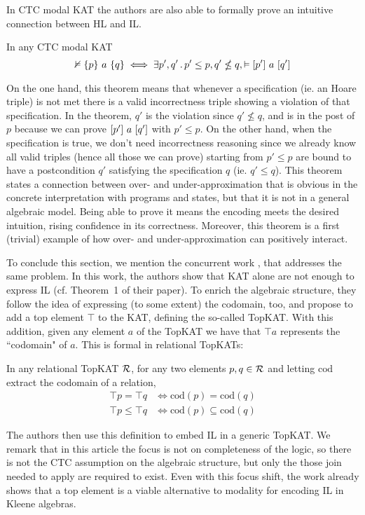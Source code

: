 In CTC modal KAT the authors are also able to formally prove an intuitive connection between HL and IL.
\begin{theorem}\label{th:sota:falsify-il-hl-topkat}
	In any CTC modal KAT
	\[
	\nvDash \{p\}~a~\{q\} \iff \exists p', q' \,.\, p' \le p, q' \nleq q, \vDash [p']~a~[q']
	\]
\end{theorem}
On the one hand, this theorem means that whenever a specification (ie. an Hoare triple) is not met there is a valid incorrectness triple showing a violation of that specification. In the theorem, $q'$ is the violation since $q' \nleq q$, and is in the post of $p$ because we can prove $[p']~a~[q']$ with $p' \le p$.
On the other hand, when the specification is true, we don't need incorrectness reasoning since we already know all valid triples (hence all those we can prove) starting from $p' \le p$ are bound to have a postcondition $q'$ satisfying the specification $q$ (ie. $q' \le q$).
This theorem states a connection between over- and under-approximation that is obvious in the concrete interpretation with programs and states, but that it is not in a general algebraic model. Being able to prove it means the encoding meets the desired intuition, rising confidence in its correctness. Moreover, this theorem is a first (trivial) example of how over- and under-approximation can positively interact.

To conclude this section, we mention the concurrent work \cite{ZAG22}, that addresses the same problem. In this work, the authors show that KAT alone are not enough to express IL (cf. Theorem~1 of their paper). To enrich the algebraic structure, they follow the idea of expressing (to some extent) the codomain, too, and propose to add a top element $\top$ to the KAT, defining the so-called TopKAT.
With this addition, given any element $a$ of the TopKAT we have that $\top a$ represents the ``codomain" of $a$. This is formal in relational TopKATs:
\begin{prop}
	In any relational TopKAT $\mathcal{R}$, for any two elements $p, q \in \mathcal{R}$ and letting $\text{cod}$ extract the codomain of a relation,
	\begin{align*}
		\top p = \top q   & \iff \text{cod}(p) = \text{cod}(q)         \\
		\top p \le \top q & \iff \text{cod}(p) \subseteq \text{cod}(q)
	\end{align*}
\end{prop}
The authors then use this definition to embed IL in a generic TopKAT.
We remark that in this article the focus is not on completeness of the logic, so there is not the CTC assumption on the algebraic structure, but only the those join needed to apply  are required to exist. Even with this focus shift, the work already shows that a top element is a viable alternative to modality for encoding IL in Kleene algebras.

